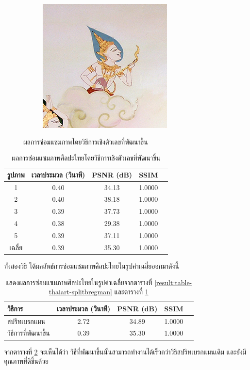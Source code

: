 \documentclass[hidelinks, a4paper,12pt]{article}
\numberwithin{equation}{section}							%
\numberwithin{equation}{section}
\begin{document}
{\begin{figure}[H]
\begin{subfigure}{0.4\linewidth}
			\includegraphics[width=0.8\linewidth]{images/result_ex4/multisplitbergman_case05.png}			
		\end{subfigure}
		\caption{ผลการซ่อมแซมภาพโดยวิธีการเชิงตัวเลขที่พัฒนาขึ้น}
	\end{figure}
		\begin{table}[H]
		\centering
		\begin{tabular}[ht]{|c|c|c|c|c|}
			\hline
			รูปภาพ &เวลาประมวล  (วินาที) & PSNR (dB) & SSIM \\
			\hline
			1 & 0.40 & 34.13 & 1.0000 \\ 
			2 & 0.40 & 38.18 & 1.0000 \\
			3 &  0.39 & 37.73 & 1.0000 \\
			4 & 0.38  & 29.38  & 1.0000 \\
			5 & 0.39  & 37.11  & 1.0000 \\
			\hline
			เฉลี่ย & 0.39  & 35.30  & 1.0000 \\
			\hline
		\end{tabular}
		\caption{ผลการซ่อมแซมภาพศิลปะไทยโดยวิธีการเชิงตัวเลขที่พัฒนาขึ้น}
		\label{result:table-thaiart-mutisplitbregman}
	\end{table}	 
	\hspace{1cm}ทั้งสองวิธี ได้ผลลัพธ์การซ่อมแซมภาพศิลปะไทยในรูปค่าเฉลี่ยออกมาดังนี้
	\begin{table}[H]
		\centering
		\begin{tabular}[ht]{|l|c|c|c|c|}
			\hline
			วิธีการ  & เวลาประมวล  (วินาที) & PSNR (dB) & SSIM \\
			\hline
			สปริทเบรกแมน & 2.72 & 34.89 & 1.0000 \\ 
			วิธีการที่พัฒนาขึ้น & 0.39 & 35.30 & 1.0000 \\
			\hline
		\end{tabular}
		\caption{แสดงผลการซ่อมแซมภาพศิลปะไทยในรูปค่าเฉลี่ยจากตารางที่ 		\ref{result:table-thaiart-splitbregman} และตารางที่ 		\ref{result:table-thaiart-mutisplitbregman} }
		\label{result:table-thaiart-summary}
	\end{table}	
	\hspace{1cm} จากตารางที่ \ref{result:table-thaiart-summary} จะเห็นได้ว่า วิธีที่พัฒนาขึ้นนั้นสามารถทำงานได้เร็วกว่าวิธีสปริทเบรกแมนเดิม และยังมีคุณภาพที่ดีขึ้นด้วย
	
}
\end{document}
